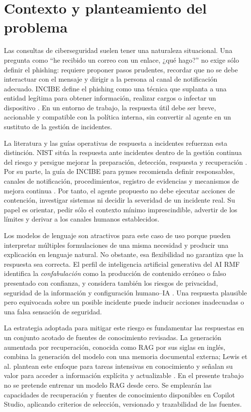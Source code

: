 \documentclass[12pt,twoside,titlepage]{book}
\begin{document}
\section{Contexto y planteamiento del problema}
\label{sec:contexto-problema}

Las consultas de ciberseguridad suelen tener una naturaleza situacional. Una
pregunta como ``he recibido un correo con un enlace, ¿qué hago?'' no exige sólo
definir el phishing: requiere proponer pasos prudentes, recordar que no se debe
interactuar con el mensaje y dirigir a la persona al canal de notificación
adecuado. INCIBE define el phishing como una técnica que suplanta a una entidad
legítima para obtener información, realizar cargos o infectar un dispositivo
\cite{incibePhishing}. En un entorno de trabajo, la respuesta útil debe ser
breve, accionable y compatible con la política interna, sin convertir al agente
en un sustituto de la gestión de incidentes.

La literatura y las guías operativas de respuesta a incidentes refuerzan esta
distinción. NIST sitúa la respuesta ante incidentes dentro de la gestión continua
del riesgo y persigue mejorar la preparación, detección, respuesta y recuperación
\cite{nistIncident2025}. Por su parte, la guía de INCIBE para pymes recomienda
definir responsables, canales de notificación, procedimientos, registro de
evidencias y mecanismos de mejora continua \cite{incibeCrisis}. Por tanto, el
agente propuesto no debe ejecutar acciones de contención, investigar sistemas ni
decidir la severidad de un incidente real. Su papel es orientar, pedir sólo el
contexto mínimo imprescindible, advertir de los límites y derivar a los canales
humanos establecidos.

Los modelos de lenguaje son atractivos para este caso de uso porque pueden
interpretar múltiples formulaciones de una misma necesidad y producir una
explicación en lenguaje natural. No obstante, esa flexibilidad no garantiza que
la respuesta sea correcta. El perfil de inteligencia artificial generativa del
AI RMF identifica la \emph{confabulación} como la producción de contenido
erróneo o falso presentado con confianza, y considera también los riesgos de
privacidad, seguridad de la información y configuración humano--IA
\cite{nistGenAi2024}. Una respuesta plausible pero equivocada sobre un posible
incidente puede inducir acciones inadecuadas o una falsa sensación de seguridad.

La estrategia adoptada para mitigar este riesgo es fundamentar las respuestas en
un conjunto acotado de fuentes de conocimiento revisadas. La generación
aumentada por recuperación, conocida como RAG por sus siglas en inglés, combina
la generación del modelo con una memoria documental externa; Lewis et al.
plantean este enfoque para tareas intensivas en conocimiento y señalan su valor
para acceder a información explícita y actualizable \cite{lewis2020rag}. En el
presente trabajo no se pretende entrenar un modelo RAG desde cero. Se emplearán
las capacidades de recuperación y fuentes de conocimiento disponibles en Copilot
Studio, aplicando criterios de selección, versionado y trazabilidad de las
fuentes.
\end{document}
